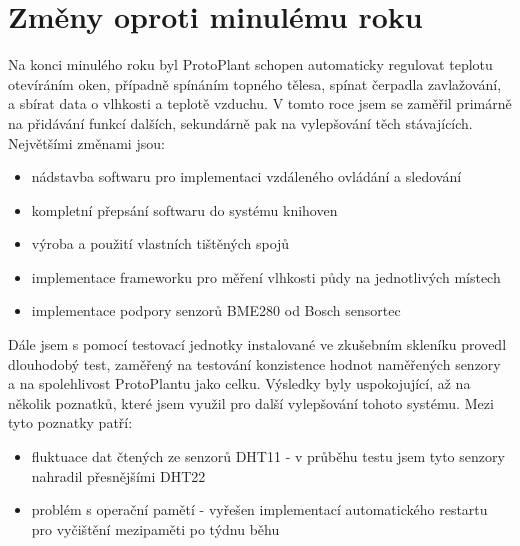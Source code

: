 \chapter{Změny oproti minulému roku}
Na konci minulého roku byl ProtoPlant schopen automaticky regulovat teplotu otevíráním oken, případně spínáním topného tělesa, spínat čerpadla zavlažování, a sbírat data o vlhkosti a teplotě vzduchu. V tomto roce jsem se zaměřil primárně na přidávání funkcí dalších, sekundárně pak na vylepšování těch stávajících.
Největšími změnami jsou: 
\begin{itemize}
    \item nádstavba softwaru pro implementaci vzdáleného ovládání a sledování
	\item kompletní přepsání softwaru do systému knihoven
	\item výroba a použití vlastních tištěných spojů
	\item implementace frameworku pro měření vlhkosti půdy na jednotlivých místech
	\item implementace podpory senzorů BME280 od Bosch sensortec
\end{itemize}

Dále jsem s pomocí testovací jednotky instalované ve zkušebním skleníku provedl dlouhodobý test, zaměřený na testování konzistence hodnot naměřených senzory a na spolehlivost ProtoPlantu jako celku. Výsledky byly uspokojující, až na několik poznatků, které jsem využil pro další vylepšování tohoto systému. Mezi tyto poznatky patří:
\begin{itemize}
    \item fluktuace dat čtených ze senzorů DHT11 - v průběhu testu jsem tyto senzory nahradil přesnějšími DHT22
    \item problém s operační pamětí - vyřešen implementací automatického restartu pro vyčištění mezipaměti po týdnu běhu
\end{itemize}
\newpage

